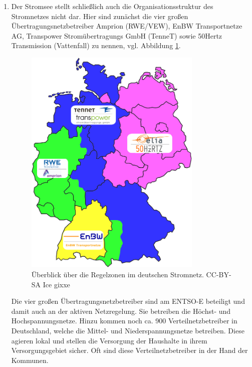 \documentclass[logo]{fhgart}
\newcommand*\imgwidth{0.8\textwidth}
\begin{document}
\begin{enumerate}
  \item Der Stromsee stellt schließlich auch die Organisationsstruktur
    des Stromnetzes nicht dar. Hier sind zunächst die vier großen
    Übertragungsnetzbetreiber Amprion (RWE/VEW), EnBW Transportnetze AG,
    Transpower Stromübertragungs GmbH (TenneT) sowie 50Hertz
    Transmission (Vattenfall) zu nennen, vgl. Abbildung
    \ref{fig:regelzonen}.  \begin{figure}[htbp] \begin{center}
      \includegraphics[width=\imgwidth]{figures/Regelzonen_deutscher_Netzbetreiber_neu.png}
      \caption{Überblick über die Regelzonen im deutschen Stromnetz.
      CC-BY-SA Ice gixxe} \label{fig:regelzonen} \end{center}
    \end{figure}
    Die vier großen Übertragungsnetzbetreiber sind am ENTSO-E beteiligt
    und damit auch an der aktiven Netzregelung. Sie betreiben die
    Höchst- und Hochspannungsnetze. Hinzu kommen noch ca. 900
    Verteilnetzbetreiber in Deutschland, welche die Mittel- und
    Niederspannungsnetze betreiben. Diese agieren lokal und stellen die
    Versorgung der Haushalte in ihrem Versorgungsgebiet sicher. Oft sind
    diese Verteilnetzbetreiber in der Hand der Kommunen.


\end{enumerate}
\end{document}
